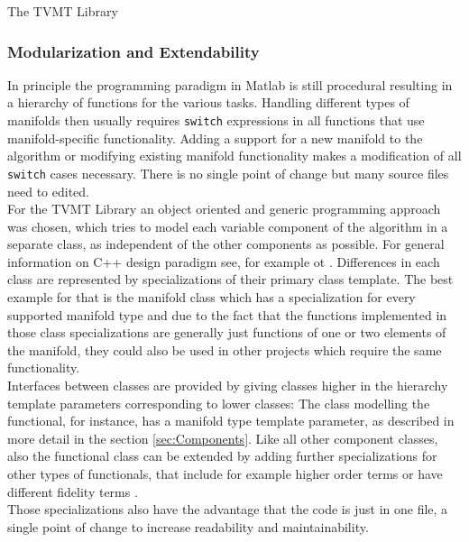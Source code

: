\begin{chapter}{The TVMT Library}
\subsubsection{Modularization and Extendability} %
\label{ssub:Modularization}
In principle the programming paradigm in Matlab is still procedural resulting in a hierarchy of functions for the various tasks. Handling different types of manifolds
then usually requires \texttt{switch} expressions in all functions that use manifold-specific functionality. Adding a support for a new manifold to the algorithm or modifying
existing manifold functionality makes a modification of all \texttt{switch} cases necessary. There is no single point of change but many source files need to edited.\\

For the TVMT Library an object oriented and generic programming approach was chosen, which tries to model each variable component of the algorithm in a separate class, as 
independent of the other components as possible. For general information on C++ design paradigm see, for example \cite{CPPTemplateMP} ot \cite{CPPGeneric}.
Differences in each class are represented by specializations of their primary class template. The best example for that is the
manifold class which has a specialization for every supported manifold type and due to the fact that the functions implemented in those class specializations are generally
just functions of one or two elements of the manifold, they could also be used in other projects which require the same functionality.\\

Interfaces between classes are provided by giving classes higher in the hierarchy template parameters corresponding to lower classes: The class modelling the functional, for instance,
has a manifold type template parameter, as described in more detail in the section \ref{sec:Components}. Like all other component classes, also the functional class can be extended
by adding further specializations for other types of functionals, that include for example higher order terms or have different fidelity terms \cite{SceneFlow}.\\

Those specializations also have the advantage that the code is just in one file, a single point of change to increase readability and maintainability.



\end{chapter}

